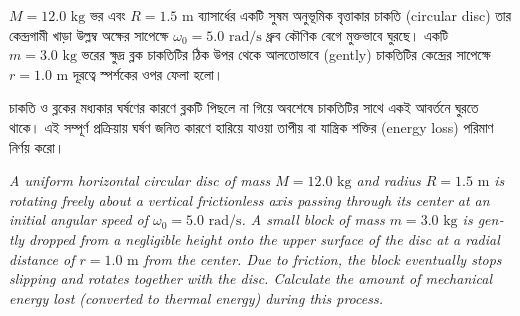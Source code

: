 \documentclass[12pt, a4paper]{article}
\begin{document}
\begin{tcolorbox}[questionbox={প্রশ্ন (Question) 10}]
\noindent
$M = 12.0\text{ kg}$ ভর এবং $R = 1.5\text{ m}$ ব্যাসার্ধের একটি সুষম অনুভূমিক বৃত্তাকার চাকতি (circular disc) তার কেন্দ্রগামী খাড়া উল্লম্ব অক্ষের সাপেক্ষে $\omega_0 = 5.0\text{ rad/s}$ ধ্রুব কৌণিক বেগে মুক্তভাবে ঘুরছে। একটি $m = 3.0\text{ kg}$ ভরের ক্ষুদ্র ব্লক চাকতিটির ঠিক উপর থেকে আলতোভাবে (gently) চাকতিটির কেন্দ্রের সাপেক্ষে $r = 1.0\text{ m}$ দূরত্বে স্পর্শকের ওপর ফেলা হলো। 

\vspace{0.3em}
\noindent
চাকতি ও ব্লকের মধ্যকার ঘর্ষণের কারণে ব্লকটি পিছলে না গিয়ে অবশেষে চাকতিটির সাথে একই আবর্তনে ঘুরতে থাকে। এই সম্পূর্ণ প্রক্রিয়ায় ঘর্ষণ জনিত কারণে হারিয়ে যাওয়া তাপীয় বা যান্ত্রিক শক্তির (energy loss) পরিমাণ নির্ণয় করো।

\vspace{0.8em}
\begin{english}
\noindent\textit{\color{darkgray}
A uniform horizontal circular disc of mass $M = 12.0\text{ kg}$ and radius $R = 1.5\text{ m}$ is rotating freely about a vertical frictionless axis passing through its center at an initial angular speed of $\omega_0 = 5.0\text{ rad/s}$. A small block of mass $m = 3.0\text{ kg}$ is gently dropped from a negligible height onto the upper surface of the disc at a radial distance of $r = 1.0\text{ m}$ from the center. Due to friction, the block eventually stops slipping and rotates together with the disc. Calculate the amount of mechanical energy lost (converted to thermal energy) during this process.
}
\end{english}
\end{tcolorbox}
\end{document}
